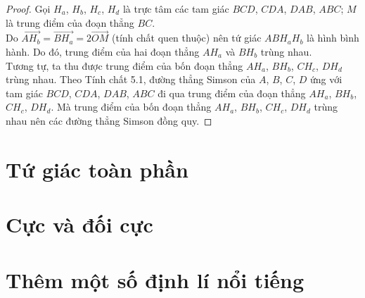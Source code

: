         \begin{proof}
            Gọi \(H_a\), \(H_b\), \(H_c\), \(H_d\) là trực tâm các tam giác \(BCD\), \(CDA\), \(DAB\), \(ABC\); \(M\) là trung điểm của đoạn thẳng \(BC\).\\
            Do \(\overrightarrow{AH_b} = \overrightarrow{BH_a} = 2 \overrightarrow{OM}\) (tính chất quen thuộc) nên tứ giác \(ABH_aH_b\) là hình bình hành. Do đó, trung điểm của hai đoạn thẳng \(AH_a\) và \(BH_b\) trùng nhau.\\
            Tương tự, ta thu được trung điểm của bốn đoạn thẳng \(AH_a\), \(BH_b\), \(CH_c\), \(DH_d\) trùng nhau. Theo Tính chất 5.1, đường thẳng Simson của \(A\), \(B\), \(C\), \(D\) ứng với tam giác \(BCD\), \(CDA\), \(DAB\), \(ABC\) đi qua trung điểm của đoạn thẳng \(AH_a\), \(BH_b\), \(CH_c\), \(DH_d\). Mà trung điểm của bốn đoạn thẳng \(AH_a\), \(BH_b\), \(CH_c\), \(DH_d\) trùng nhau nên các đường thẳng Simson đồng quy.
        \end{proof}

    \section{Tứ giác toàn phần}

    \section{Cực và đối cực}

    \section{Thêm một số định lí nổi tiếng}

    \newpage